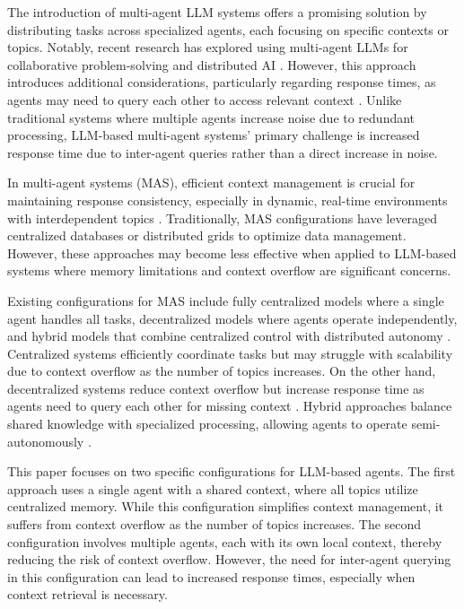 \documentclass{article}
\begin{document}
The introduction of multi-agent LLM systems offers a promising solution by distributing tasks across specialized agents, each focusing on specific contexts or topics. Notably, recent research has explored using multi-agent LLMs for collaborative problem-solving and distributed AI \citep{shehory1998methods, stone2019multiagent, tambe1997towards}. However, this approach introduces additional considerations, particularly regarding response times, as agents may need to query each other to access relevant context \citep{kaminka2002multi}. Unlike traditional systems where multiple agents increase noise due to redundant processing, LLM-based multi-agent systems' primary challenge is increased response time due to inter-agent queries rather than a direct increase in noise.

In multi-agent systems (MAS), efficient context management is crucial for maintaining response consistency, especially in dynamic, real-time environments with interdependent topics \citep{ferber1999multiagent, shehory1998methods}. Traditionally, MAS configurations have leveraged centralized databases \citep{bernstein1986concurrency} or distributed grids \citep{foster2001grid} to optimize data management. However, these approaches may become less effective when applied to LLM-based systems where memory limitations and context overflow are significant concerns.

Existing configurations for MAS include fully centralized models where a single agent handles all tasks, decentralized models where agents operate independently, and hybrid models that combine centralized control with distributed autonomy \citep{parunak1999industrial, tambe1997towards}. Centralized systems efficiently coordinate tasks but may struggle with scalability due to context overflow as the number of topics increases. On the other hand, decentralized systems reduce context overflow but increase response time as agents need to query each other for missing context \citep{kaminka2002multi, shehory1998multi}. Hybrid approaches balance shared knowledge with specialized processing, allowing agents to operate semi-autonomously \citep{ross2019probability}.

This paper focuses on two specific configurations for LLM-based agents. The first approach uses a single agent with a shared context, where all topics utilize centralized memory. While this configuration simplifies context management, it suffers from context overflow as the number of topics increases. The second configuration involves multiple agents, each with its own local context, thereby reducing the risk of context overflow. However, the need for inter-agent querying in this configuration can lead to increased response times, especially when context retrieval is necessary.
\end{document}
